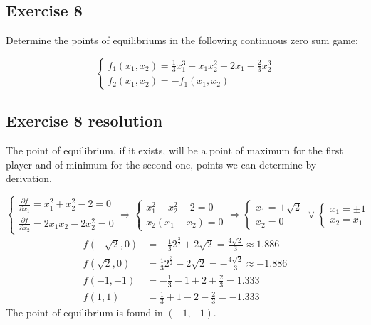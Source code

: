 \documentclass[\main/main.tex]{subfiles}
\begin{document}
\subsection{Exercise 8}
Determine the points of equilibriums in the following continuous zero sum game:

\[
  \begin{cases}
    f_1(x_1,x_2) = \frac{1}{3}x_1^3 + x_1x_2^2 - 2x_1 - \frac{2}{3}x_2^3 \\
    f_2(x_1,x_2) = -f_1(x_1,x_2)
  \end{cases}
\]
\subsection{Exercise 8 resolution}
The point of equilibrium, if it exists, will be a point of maximum for the first player and of minimum for the second one, points we can determine by derivation.

\[
  \begin{cases}
    \frac{\partial f}{\partial x_1}=x_1^2 + x_2^2 -2 = 0 \\
    \frac{\partial f}{\partial x_2}=2x_1x_2 -2x_2^2=0
  \end{cases}
  \Rightarrow
  \begin{cases}
    x_1^2 + x_2^2 -2 = 0 \\
    x_2(x_1 -x_2)=0
  \end{cases}
  \Rightarrow
  \begin{cases}
    x_1 = \pm \sqrt{2} \\
    x_2=0
  \end{cases}
  \lor
  \begin{cases}
    x_1 = \pm 1 \\
    x_2=x_1
  \end{cases}
\]
\begin{align*}
  f(-\sqrt{2},0) & = -\frac{1}{3}2^{\frac{3}{2}} + 2\sqrt{2} = \frac{4\sqrt{2}}{3} \approx 1.886 \\
  f(\sqrt{2},0)  & = \frac{1}{3}2^{\frac{3}{2}} - 2\sqrt{2} = -\frac{4\sqrt{2}}{3} \approx -1.886 \\
  f(-1,-1)       & = -\frac{1}{3} -1 +2 + \frac{2}{3} = 1.333        \\
  f(1,1)         & = \frac{1}{3} +1 -2 - \frac{2}{3} = -1.333
\end{align*}
The point of equilibrium is found in $(-1,-1)$.
\end{document}
